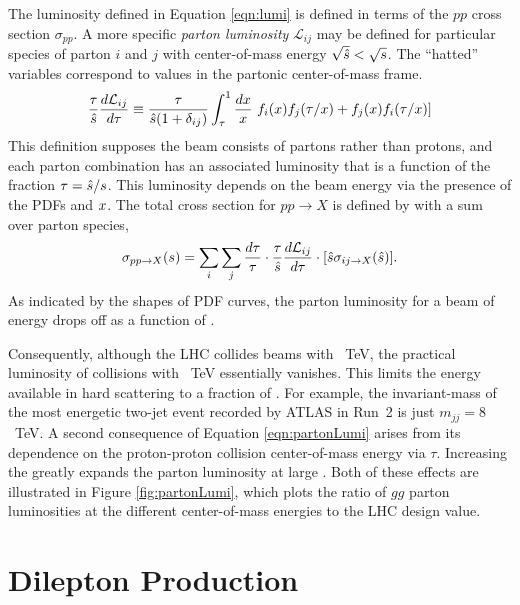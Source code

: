 The luminosity defined in Equation \ref{eqn:lumi} is defined in terms of the $pp$ cross section $\sigma_{pp}$.
A more specific \emph{parton luminosity} $\mathcal{L}_{ij}$ may be defined for particular species of parton $i$ and $j$ with center-of-mass energy $\sqrt{\hat{s}}<\sqrt{s}$.
The ``hatted'' variables correspond to values in the partonic center-of-mass frame.
\begin{equation}\begin{split}\label{eqn:partonLumi}
\frac{\tau}{\hat{s}}\frac{d\mathcal{L}_{ij}}{d\tau}\equiv\frac{\tau}{\hat{s}(1+\delta_{ij})} \int_\tau^1 \frac{dx}{x}~f_i(x)f_j(\tau/x)+f_j(x)f_i(\tau/x)]
\end{split}\end{equation}
This definition supposes the beam consists of partons rather than protons, and each parton combination has an associated luminosity that is a function of the fraction $\tau=\hat{s}/s$.
This luminosity depends on the beam energy via the presence of the PDFs and $x$.
The total cross section for $pp\to X$ is defined by with a sum over parton species,
\begin{equation}\begin{split}
\sigma_{pp\to X}(s)=\sum_i\sum_j \frac{d\tau}{\tau}\cdot\frac{\tau}{\hat{s}}\frac{d\mathcal{L}_{ij}}{d\tau}\cdot[\hat{s}\sigma_{ij\to X}(\hat{s})].
\end{split}\end{equation} 
As indicated by the shapes of PDF curves, the parton luminosity for a beam of energy \sqrts drops off as a function of \sqrths.
\cite{quigg}

Consequently, although the LHC collides beams with ~TeV, the practical luminosity of collisions with ~TeV essentially vanishes.
This limits the energy available in hard scattering to a fraction of \sqrts.
For example, the invariant-mass of the most energetic two-jet event recorded by ATLAS in Run~2 is just $m_{jj}=8$~TeV.
A second consequence of Equation \ref{eqn:partonLumi} arises from its dependence on the proton-proton collision center-of-mass energy \sqrts via $\tau$.
Increasing the \sqrts greatly expands the parton luminosity at large \sqrths.
Both of these effects are illustrated in Figure \ref{fig:partonLumi}, which plots the ratio of $gg$ parton luminosities at the different center-of-mass energies to the LHC design value.

\section{Dilepton Production}\label{sec:phenoBkg}


